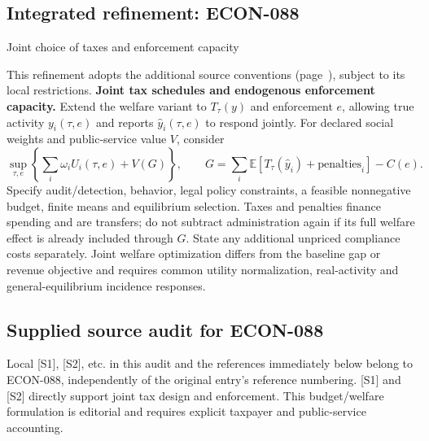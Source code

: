 \documentclass[11pt,a4paper]{article}
\begin{document}
\subsection*{Integrated refinement: ECON-088}
{\sffamily\small\color{muted}Joint choice of taxes and enforcement capacity\par}
This refinement adopts the additional source conventions
(page~\pageref{audited:conventions}), subject to its local restrictions.
\textbf{Joint tax schedules and endogenous enforcement capacity.}
Extend the welfare variant to $T_\tau(y)$ and enforcement $e$, allowing true
activity $y_i(\tau,e)$ and reports $\widehat y_i(\tau,e)$ to respond jointly.
For declared social weights and public-service value $V$, consider
\[
\sup_{\tau,e}\left\{\sum_i\omega_iU_i(\tau,e)+V(G)\right\},\qquad
G=\sum_i\mathbb E[T_\tau(\widehat y_i)+\mathrm{penalties}_i]-C(e).
\]
Specify audit/detection, behavior, legal policy constraints, a feasible
nonnegative budget, finite means and equilibrium selection. Taxes and penalties
finance spending and are transfers; do not subtract administration again if its
full welfare effect is already included through $G$. State any additional
unpriced compliance costs separately. Joint welfare optimization differs from
the baseline gap or revenue objective and requires common utility normalization,
real-activity and general-equilibrium incidence responses.
\subsection*{Supplied source audit for ECON-088}
Local [S1], [S2], etc. in this audit and the references immediately below
belong to ECON-088, independently of the original entry's reference numbering.
[S1] and [S2] directly support joint tax design and enforcement. This budget/welfare formulation is editorial and requires explicit taxpayer and public-service accounting.
\end{document}
